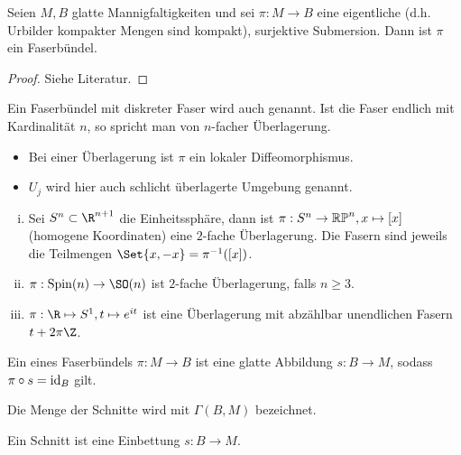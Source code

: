 \begin{st} \label{5.2}
    Seien $M, B$ glatte Mannigfaltigkeiten und sei $\pi: M \to B$ eine eigentliche (d.h. Urbilder kompakter Mengen sind kompakt), surjektive Submersion.
    Dann ist $\pi$ ein Faserbündel.
    \begin{proof}
        Siehe Literatur.
    \end{proof}
\end{st}

\begin{df} \label{5.3}
    Ein Faserbündel mit diskreter Faser wird auch  genannt. 
    Ist die Faser endlich mit Kardinalität $n$, so spricht man von $n$-facher Überlagerung.
    \begin{note}
        \begin{itemize}
            \item
                Bei einer Überlagerung ist $\pi$ ein lokaler Diffeomorphismus.
            \item
                $U_j$ wird hier auch schlicht überlagerte Umgebung genannt.
        \end{itemize}
    \end{note}
\end{df}

\begin{ex*}
    \begin{enumerate}[(i)]
        \item
            Sei $S^n \subset \R^{n+1}$ die Einheitssphäre, dann ist $\pi: S^n \to \mathbb{RP}^n, x \mapsto [x]$ (homogene Koordinaten) eine $2$-fache Überlagerung.
            Die Fasern sind jeweils die Teilmengen $\Set{x, -x} = \pi^{-1}([x])$.
        \item
            $\pi: \operatorname{Spin}(n) \to \SO(n)$ ist $2$-fache Überlagerung, falls $n \ge 3$.
        \item
            $\pi: \R \mapsto S^1, t \mapsto e^{it}$ ist eine Überlagerung mit abzählbar unendlichen Fasern $t + 2\pi\Z$.
    \end{enumerate}
\end{ex*}

\begin{df} \label{5.4}
    Ein  eines Faserbündels $\pi: M \to B$ ist eine glatte Abbildung $s: B \to M$, sodass $\pi \circ s = \operatorname{id}_B$ gilt.

    Die Menge der Schnitte wird mit $\Gamma(B, M)$ bezeichnet.
    \begin{note}
        Ein Schnitt ist eine Einbettung $s: B \to M$.
    \end{note}
\end{df}

